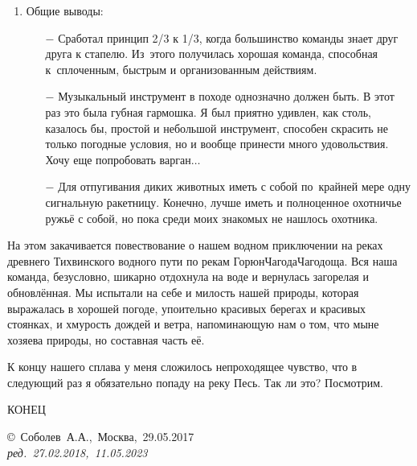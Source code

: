 \begin{enumerate}
\begin{enumerate}
	\end{enumerate}
\item Общие выводы:
	\begin{enumerate}
		\item[$-$] Сработал принцип 2/3 к 1/3, когда большинство команды знает друг друга к стапелю. Из~этого получилась хорошая команда, способная к~сплоченным, быстрым и организованным действиям.
		\item[$-$] Музыкальный инструмент в походе однозначно должен быть. В этот раз это была губная гармошка. Я был приятно удивлен, как столь, казалось бы, простой и небольшой инструмент, способен скрасить не только погодные условия, но и вообще принести много удовольствия. Хочу еще попробовать варган$\ldots$
		\item[$-$] Для отпугивания диких животных иметь с собой по~крайней мере одну сигнальную ракетницу. Конечно, лучше иметь и полноценное охотничье ружьё с собой, но пока среди моих знакомых не нашлось охотника.
	\end{enumerate}
\end{enumerate}	

На этом закачивается повествование о нашем водном приключении на реках древнего Тихвинского водного пути по рекам Горюн\sdash Чагода\sdash Чагодоща. Вся наша команда, безусловно, шикарно отдохнула на воде и вернулась загорелая и обновлённая. Мы испытали на себе и милость нашей природы, которая выражалась в хорошей погоде, упоительно красивых берегах и красивых стоянках, и хмурость дождей и ветра, напоминающую нам о том, что мы\mdash не хозяева природы, но составная часть её.

К концу нашего сплава у меня сложилось непроходящее чувство, что в следующий раз я обязательно попаду на реку Песь. Так ли это? Посмотрим.

\begin{center}
\end{center}

\begin{center}
	\Large {КОНЕЦ}
\end{center}
\vspace{\fill}
\begin{flushright}
	\copyright~Соболев~А.А.,~Москва,~29.05.2017\\
	\textit{ред.~27.02.2018,~11.05.2023}
\end{flushright}